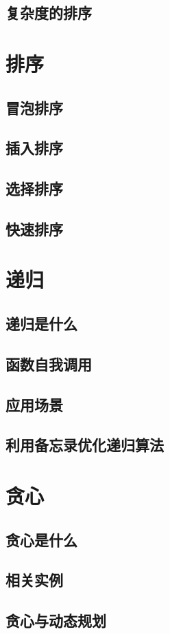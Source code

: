 \documentclass{book}
\begin{document}
\section{复杂度的排序}
\chapter{排序}
\section{冒泡排序}
\section{插入排序}
\section{选择排序}
\section{快速排序}
\chapter{递归}
\section{递归是什么}
\section{函数自我调用}
\section{应用场景}
\section{利用备忘录优化递归算法}
\chapter{贪心}
\section{贪心是什么}
\section{相关实例}
\section{贪心与动态规划}
\end{document}
